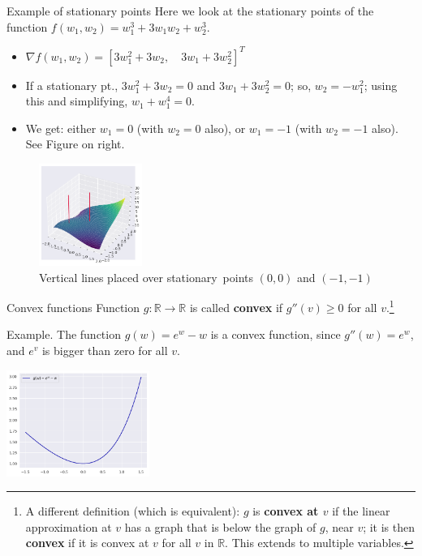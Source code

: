 \documentclass{beamer}
\theoremstyle{example}
\begin{document}
\begin{frame}{Example of stationary points}
    Here we look at the stationary points of the function $f(w_1,w_2) = w_1^3+3w_1w_2+w_2^3$.

    {\small
    \begin{itemize}
        \item $\nabla f(w_1,w_2) = [3w_1^2 + 3w_2,\quad 3w_1+3w_2^2]^T$
    \end{itemize}
    \pause
    \begin{multicols}{2}
        \begin{itemize}
            \item If a stationary pt., $3w_1^2 + 3w_2=0$ and $3w_1+3w_2^2=0$; so, $w_2 = -w_1^2$; using this and simplifying, $w_1+w_1^4 = 0$.
            \pause
            \item We get: either $w_1=0$ (with $w_2=0$ also), or $w_1=-1$ (with $w_2=-1$ also). \newline 
            See Figure on right.
        \end{itemize}

        \begin{figure}
        \includegraphics[width=0.3\textwidth]{../../Images/stationary-points_PolyFunction-2Vars.png}
        \captionsetup{font=scriptsize}
        \caption*{Vertical lines placed over stationary\newline\ points $(0,0)$ and $(-1,-1)$}
        \end{figure}
    \end{multicols}
    }
\end{frame}

\begin{frame}{Convex functions}
    Function $g:\mathbb R\to\mathbb R$ is called \textbf{convex} if $g''(v) \ge 0$ for all $v$.\footnote{A different definition (which is equivalent): $g$ is \textbf{convex at $v$} if the linear approximation at $v$ has a graph that is below the graph of $g$, near $v$; it is then \textbf{convex} if it is convex at $v$ for all $v$ in $\mathbb R$. This extends to multiple variables.} 

    \pause
    \begin{alertblock}{Example.} The function $g(w) = e^w - w$ is a convex function, since $g''(w) = e^w$, and $e^v$ is bigger than zero for all $v$.
    \end{alertblock}
    \centering 
    \includegraphics[width=0.35\textwidth]{../../Images/convex-1Var.png}
    \vfill
\end{frame}
\end{document}
